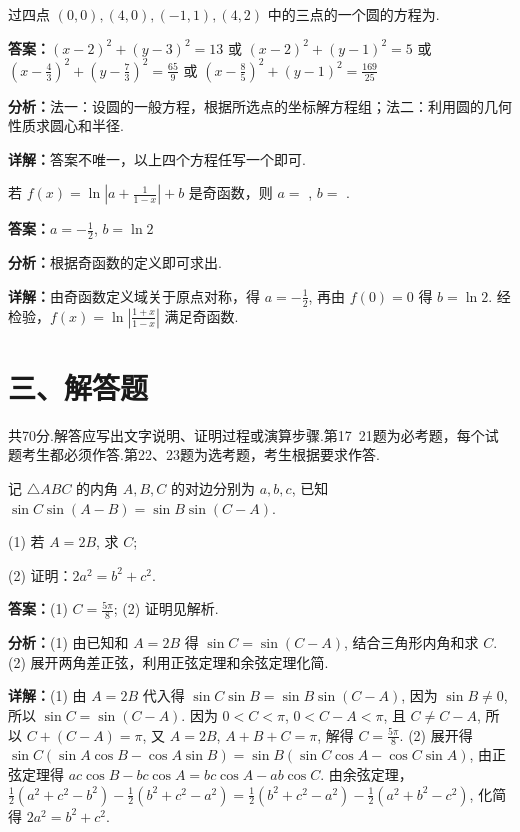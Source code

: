 \begin{question}[points=5]
过四点 $(0,0), (4,0), (-1,1), (4,2)$ 中的三点的一个圆的方程为.
\fillin[{$(x-2)^2+(y-3)^2=13$ 或 $(x-2)^2+(y-1)^2=5$ 或 $(x-\frac{4}{3})^2+(y-\frac{7}{3})^2=\frac{65}{9}$ 或 $(x-\frac{8}{5})^2+(y-1)^2=\frac{169}{25}$}]
\begin{solution}
\textbf{答案：}$(x-2)^2+(y-3)^2=13$ 或 $(x-2)^2+(y-1)^2=5$ 或 $(x-\frac{4}{3})^2+(y-\frac{7}{3})^2=\frac{65}{9}$ 或 $(x-\frac{8}{5})^2+(y-1)^2=\frac{169}{25}$

\textbf{分析：}法一：设圆的一般方程，根据所选点的坐标解方程组；法二：利用圆的几何性质求圆心和半径.

\textbf{详解：}答案不唯一，以上四个方程任写一个即可.
\end{solution}
\end{question}

\begin{question}[points=5]
若 $f(x) = \ln\left| a + \frac{1}{1-x} \right| + b$ 是奇函数，则 $a=$ , $b=$ .
\fillin[{$a=-\frac12$, $b=\ln2$}]
\begin{solution}
\textbf{答案：}$a=-\frac12$, $b=\ln2$

\textbf{分析：}根据奇函数的定义即可求出.

\textbf{详解：}由奇函数定义域关于原点对称，得 $a=-\frac12$, 再由 $f(0)=0$ 得 $b=\ln2$. 经检验，$f(x)=\ln\left|\frac{1+x}{1-x}\right|$ 满足奇函数.
\end{solution}
\end{question}

\section*{三、解答题}
共70分.解答应写出文字说明、证明过程或演算步骤.第17~21题为必考题，每个试题考生都必须作答.第22、23题为选考题，考生根据要求作答.

\begin{question}[points=12]
记 $\triangle ABC$ 的内角 $A,B,C$ 的对边分别为 $a,b,c$, 已知 $\sin C \sin(A-B) = \sin B \sin(C-A)$.

(1) 若 $A=2B$, 求 $C$;

(2) 证明：$2a^2 = b^2 + c^2$.
\begin{solution}
\textbf{答案：}(1) $C = \frac{5\pi}{8}$; (2) 证明见解析.

\textbf{分析：}(1) 由已知和 $A=2B$ 得 $\sin C = \sin(C-A)$, 结合三角形内角和求 $C$.
(2) 展开两角差正弦，利用正弦定理和余弦定理化简.

\textbf{详解：}(1) 由 $A=2B$ 代入得 $\sin C\sin B = \sin B\sin(C-A)$, 因为 $\sin B\neq0$, 所以 $\sin C = \sin(C-A)$. 因为 $0<C<\pi$, $0<C-A<\pi$, 且 $C\neq C-A$, 所以 $C+(C-A)=\pi$, 又 $A=2B$, $A+B+C=\pi$, 解得 $C=\frac{5\pi}{8}$.
(2) 展开得 $\sin C(\sin A\cos B-\cos A\sin B) = \sin B(\sin C\cos A-\cos C\sin A)$, 由正弦定理得 $ac\cos B - bc\cos A = bc\cos A - ab\cos C$. 由余弦定理，$\frac12(a^2+c^2-b^2)-\frac12(b^2+c^2-a^2) = \frac12(b^2+c^2-a^2)-\frac12(a^2+b^2-c^2)$, 化简得 $2a^2=b^2+c^2$.
\end{solution}
\end{question}

